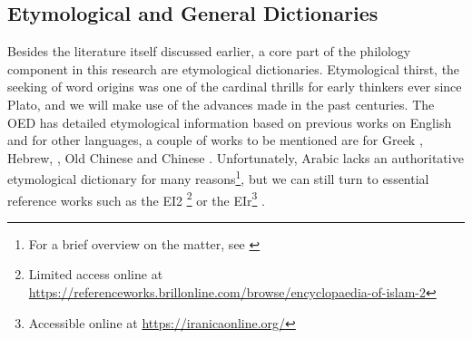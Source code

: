 \subsection{Etymological and General Dictionaries}

Besides the literature itself discussed earlier, a core part of the philology component in this research are etymological dictionaries. Etymological thirst, the seeking of word origins was one of the cardinal thrills for early thinkers ever since Plato, and we will make use of the advances made in the past centuries. The \gls{OED} has detailed etymological information based on previous works on English and for other languages, a couple of works to be mentioned are for Greek \textcite{beekes_etymological_2010}, Hebrew, \textcite{klein_comprehensive_1987}, Old Chinese \textcite{schuessler_abc_2007} and Chinese \textcite{liu_hanyu_1985}. Unfortunately, Arabic lacks an authoritative etymological dictionary for many reasons\footnote{For a brief overview on the matter, see \textcite{blazek_etymology_2006}}, but we can still turn to essential reference works such as the \gls{EI2} \footnote{Limited access online at \url{https://referenceworks.brillonline.com/browse/encyclopaedia-of-islam-2}} \autocite{ei2} or the \gls{EIr}\footnote{Accessible online at \url{https://iranicaonline.org/}} \autocite{eir}. 











